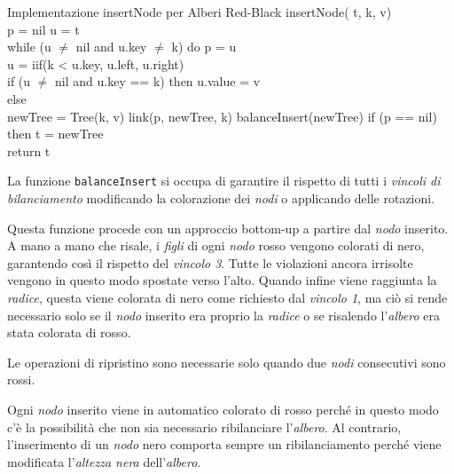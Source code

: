 \begin{minicode}{Implementazione insertNode per Alberi Red-Black}
\ind{} insertNode( t,  k,  v)\\
     p = nil\hfill{}
     u = t\\
    \indf while (u $\neq$ nil and u.key $\neq$ k) do\hfill{}
        p = u\\
        u = iif(k < u.key, u.left, u.right)\\
    \indf if (u $\neq$ nil and u.key == k) then\hfill{}
        u.value = v\\
    \indf else\\
         newTree = Tree(k, v)\hfill{}
        link(p, newTree, k)\hfill{}
        balanceInsert(newTree)\hfill{}
        \indff if (p == nil) then\hfill{}
            t = newTree\\
    \indf return t
\end{minicode}\noindent
La funzione \texttt{balanceInsert} si occupa di garantire il rispetto di tutti i
\emph{vincoli di bilanciamento} modificando la colorazione dei \emph{nodi} o
applicando delle rotazioni.

Questa funzione procede con un approccio bottom-up a partire dal \emph{nodo}
inserito. A mano a mano che risale, i \emph{figli} di ogni \emph{nodo} rosso
vengono colorati di nero, garantendo così il rispetto del \emph{vincolo 3}.
Tutte le violazioni ancora irrisolte vengono in questo modo spostate verso
l'alto. Quando infine viene raggiunta la \emph{radice}, questa viene colorata
di nero come richiesto dal \emph{vincolo 1}, ma ciò si rende necessario solo se
il \emph{nodo} inserito era proprio la \emph{radice} o se risalendo
l'\emph{albero} era stata colorata di rosso.

\begin{note}
    Le operazioni di ripristino sono necessarie solo quando due \emph{nodi}
    consecutivi sono rossi.
\end{note}
\begin{note}
    Ogni \emph{nodo} inserito viene in automatico colorato di rosso perché in
    questo modo c'è la possibilità che non sia necessario ribilanciare
    l'\emph{albero}. Al contrario, l'inserimento di un \emph{nodo} nero
    comporta sempre un ribilanciamento perché viene modificata
    l'\emph{altezza nera} dell'\emph{albero}.
\end{note}

